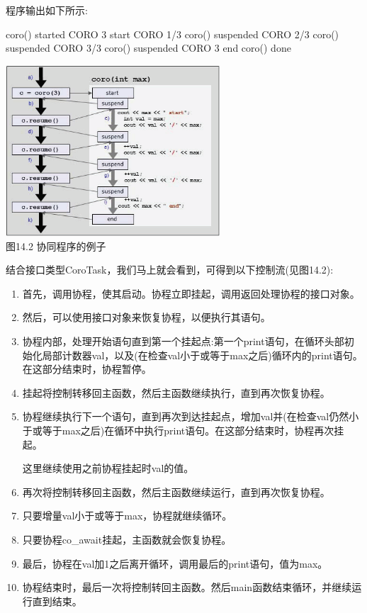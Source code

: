 程序输出如下所示:

\begin{shell}
coro() started
         CORO 3 start
         CORO 1/3
coro() suspended
         CORO 2/3
coro() suspended
         CORO 3/3
coro() suspended
         CORO 3 end
coro() done
\end{shell}


\begin{center}
\includegraphics[width=0.6\textwidth]{content/chapter14/images/2.png}\\
图14.2 协同程序的例子
\end{center}

结合接口类型CoroTask，我们马上就会看到，可得到以下控制流(见图14.2):

\begin{enumerate}[label=\alph*)]
\item
首先，调用协程，使其启动。协程立即挂起，调用返回处理协程的接口对象。

\item
然后，可以使用接口对象来恢复协程，以便执行其语句。

\item
协程内部，处理开始语句直到第一个挂起点:第一个print语句，在循环头部初始化局部计数器val，以及(在检查val小于或等于max之后)循环内的print语句。在这部分结束时，协程暂停。

\item
挂起将控制转移回主函数，然后主函数继续执行，直到再次恢复协程。

\item
协程继续执行下一个语句，直到再次到达挂起点，增加val并(在检查val仍然小于或等于max之后)在循环中执行print语句。在这部分结束时，协程再次挂起。

这里继续使用之前协程挂起时val的值。

\item
再次将控制转移回主函数，然后主函数继续运行，直到再次恢复协程。

\item
只要增量val小于或等于max，协程就继续循环。

\item
只要协程co\_await挂起，主函数就会恢复协程。

\item
最后，协程在val加1之后离开循环，调用最后的print语句，值为max。

\item
协程结束时，最后一次将控制转回主函数。然后main函数结束循环，并继续运行直到结束。
\end{enumerate}

